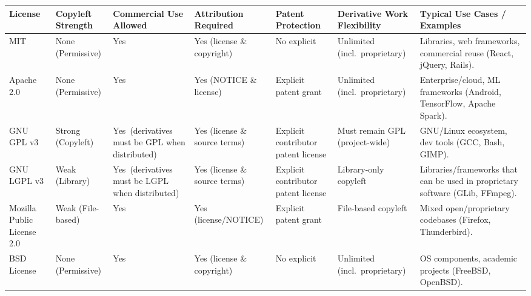 \documentclass[10pt]{article}
\begin{document}
\begin{tabular}{|>{\small}p{2.1cm}|>{\small}p{1.8cm}|>{\small}p{2.3cm}|>{\small}p{2.1cm}|>{\small}p{1.8cm}|>{\small}p{2.5cm}|>{\small}p{5cm}|}
\hline
\textbf{License} & \textbf{Copyleft Strength} & \textbf{Commercial Use Allowed} & \textbf{Attribution Required} & \textbf{Patent Protection} & \textbf{Derivative Work Flexibility} & \textbf{Typical Use Cases / Examples} \\
\hline
MIT           & None (Permissive) & Yes & Yes (license \& copyright) & No explicit & Unlimited (incl.\ proprietary) & Libraries, web frameworks, commercial reuse (React, jQuery, Rails). \\
\hline
Apache 2.0    & None (Permissive) & Yes & Yes (NOTICE \& license) & Explicit patent grant & Unlimited (incl.\ proprietary) & Enterprise/cloud, ML frameworks (Android, TensorFlow, Apache Spark). \\
\hline
GNU GPL v3    & Strong (Copyleft) & Yes\footnotesize~(derivatives must be GPL when distributed) & Yes (license \& source terms) & Explicit contributor patent license & Must remain GPL (project-wide) & GNU/Linux ecosystem, dev tools (GCC, Bash, GIMP). \\
\hline
GNU LGPL v3 & Weak (Library) & Yes\footnotesize~(derivatives must be LGPL when distributed) & Yes (license \& source terms) & Explicit contributor patent license & Library-only copyleft & Libraries/frameworks that can be used in proprietary software (GLib, FFmpeg). \\
\hline
Mozilla Public License 2.0 & Weak (File-based) & Yes & Yes (license/NOTICE) & Explicit patent grant & File-based copyleft & Mixed open/proprietary codebases (Firefox, Thunderbird). \\
\hline
BSD License & None (Permissive) & Yes & Yes (license \& copyright) & No explicit & Unlimited (incl.\ proprietary) & OS components, academic projects (FreeBSD, OpenBSD). \\
\hline
\end{tabular}
\end{document}

